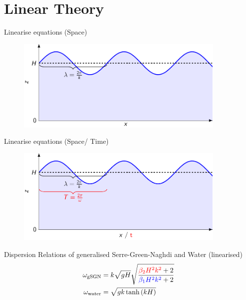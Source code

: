 \documentclass[pdf]{beamer}
\begin{document}
\section{Linear Theory}    
    
\begin{frame}{Linearise equations (Space)}
\begin{figure}
	\centering
	\includegraphics[width=0.9\textwidth]{./Pics/Tex/Explanatory/DispersionPlot/Dispersion.pdf}
\end{figure}
\end{frame}

\begin{frame}{Linearise equations (Space/ {\color{red} Time})}
\begin{figure}
	\centering
	\includegraphics[width=0.9\textwidth]{./Pics/Tex/Explanatory/DispersionPlot/Dispersion_Analagous.pdf}
\end{figure}
\end{frame}

\begin{frame}{Dispersion Relations of generalised Serre-Green-Naghdi and Water (linearised)}
\begin{align*}
\omega_{\text{gSGN}} & =  k \sqrt{gH} \sqrt{\dfrac{{\color{red}\beta_2 H^2 k^2} + 2}{ {\color{blue}\beta_1 H^2 k^2} + 2}} \\
\omega_{\text{water}} & = \sqrt{gk \tanh\left(kH\right)}
\end{align*}
\end{frame}
\end{document}
